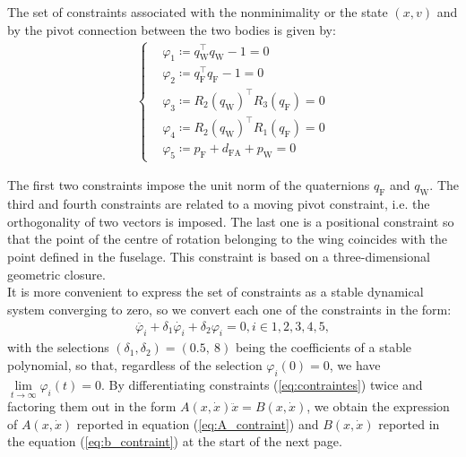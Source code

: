 The set of constraints associated with the nonminimality or the state $(x,v)$ and by the pivot connection between the two bodies is given by:
\begin{align}
    \label{eq:contraintes}
    \left\{
    \begin{aligned}
    &\varphi_{1} \coloneqq q_{\text{W}}^\top q_{\text{W}} - 1 = 0\\
    &\varphi_{2} \coloneqq q_{\text{F}}^\top q_{\text{F}} - 1 = 0\\
    &\varphi_{3} \coloneqq R_{2}(q_{\text{W}})^\top R_{3}(q_{\text{F}}) = 0\\
    &\varphi_{4} \coloneqq R_{2}(q_{\text{W}})^\top R_{1}(q_{\text{F}}) = 0\\
    &\varphi_{5} \coloneqq p_{\text{F}} + d_{\text{FA}} + p_{\text{W}} = 0
    \end{aligned}
    \right.
\end{align}

The first two constraints impose the unit norm of the quaternions $q_{\text{F}}$ and $q_{\text{W}}$.
The third and fourth constraints are related to a moving pivot constraint, i.e. the orthogonality of two vectors is imposed. The last one is a positional constraint so that the point of the centre of rotation belonging to the wing coincides with the point defined in the fuselage. This constraint is based on a three-dimensional geometric closure.\\
It is more convenient to express the set of constraints as a stable dynamical system converging to zero, so we convert each one of the constraints in the form:
\begin{align}
    \ddot{\varphi_{i}} + \delta_{1} \dot{\varphi_{i}}  + \delta_{2} \varphi_{i} = 0, i \in {1,2,3,4,5},
\end{align}
with the selections $(\delta_{1}, \delta_{2}) = (0.5,~8)$ being the coefficients of a stable polynomial, so that, regardless of the selection $\varphi_{i}(0) = 0$, we have $\lim\limits_{t \to \infty} \varphi_{i}(t) = 0$. By differentiating constraints (\ref{eq:contraintes}) twice and factoring them out in the form $ A(x,\dot{x}) \ddot{x} = B(x,\dot{x})$, we obtain the expression of $A(x,\dot{x})$ reported in equation  (\ref{eq:A_contraint}) and $B(x,\dot{x})$ reported in the equation  (\ref{eq:b_contraint}) at the start of the next page.


